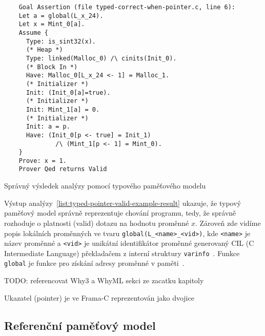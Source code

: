 \begin{listing}[H]
    \begin{verbatim}
    Goal Assertion (file typed-correct-when-pointer.c, line 6):
    Let a = global(L_x_24).
    Let x = Mint_0[a].
    Assume {
      Type: is_sint32(x).
      (* Heap *)
      Type: linked(Malloc_0) /\ cinits(Init_0).
      (* Block In *)
      Have: Malloc_0[L_x_24 <- 1] = Malloc_1.
      (* Initializer *)
      Init: (Init_0[a]=true).
      (* Initializer *)
      Init: Mint_1[a] = 0.
      (* Initializer *)
      Init: a = p.
      Have: (Init_0[p <- true] = Init_1)
              /\ (Mint_1[p <- 1] = Mint_0).
    }
    Prove: x = 1.
    Prover Qed returns Valid
    \end{verbatim}
    \caption{Správný výsledek analýzy pomocí typového paměťového modelu}
    \label{list:typed-pointer-valid-example-result}
\end{listing}

Výstup analýzy~\ref{list:typed-pointer-valid-example-result} ukazuje,
že typový paměťový model správně reprezentuje chování programu,
tedy, že správně rozhoduje o platnosti (valid) dotazu na hodnotu proměnné $x$.
Zároveň zde vidíme popis lokálních proměnných ve tvaru \texttt{global(L\_<name>\_<vid>)},
kde \texttt{<name>} je název proměnné a \texttt{<vid>} je unikátní identifikátor proměnné
generovaný CIL (C Intermediate Language) překladačem z interní struktury \texttt{varinfo}~\cite{FCPluginDevSignoles2024}.
Funkce \texttt{global} je funkce pro získání adresy proměnné v paměti~\cite{BlanchardWP2024}.

TODO: referencovat Why3 a WhyML sekci ze zacatku kapitoly




Ukazatel (pointer) je ve Frama\mbox{-}C reprezentován jako dvojice


\subsection{Referenční paměťový model}
\label{subsec:referencni-pametovy-model}


